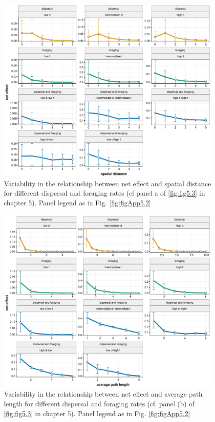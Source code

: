 \newpage

\begin{figure}
\centering
\includegraphics[width=\textwidth,height=\textheight,keepaspectratio]{./Figures/Appendix5_1/Fig_3.png}
\caption[Varying spatial decay with $d$ and $f$]{\color{Gray} Variability in the relationship between net effect and spatial distance for different dispersal and foraging rates (cf panel a of \cref{fig:fig5.3} in chapter 5). Panel legend as in Fig. \ref{fig:figApp5.2} \label{fig:figApp5.3}}
\end{figure}

\newpage

\begin{figure}
\centering
\includegraphics[width=\textwidth,height=\textheight,keepaspectratio]{./Figures/Appendix5_1/Fig_4.png}
\caption[Varying path length decay with $d$ and $f$]{\color{Gray} Variability in the relationship between net effect and average path length for different dispersal and foraging rates (cf. panel (b) of \cref{fig:fig5.3} in chapter 5). Panel legend as in Fig. \ref{fig:figApp5.2} \label{fig:figApp5.4}}
\end{figure}
